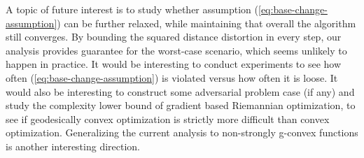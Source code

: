 A topic of future interest is to study whether assumption (\ref{eq:base-change-assumption}) can be further relaxed, while maintaining that overall the algorithm still converges. By bounding the squared distance distortion in every step, our analysis provides guarantee for the worst-case scenario, which seems unlikely to happen in practice. It would be interesting to conduct experiments to see how often (\ref{eq:base-change-assumption}) is violated versus how often it is loose. It would also be interesting to construct some adversarial problem case (if any) and study the complexity lower bound of gradient based Riemannian optimization, to see if geodesically convex optimization is strictly more difficult than convex optimization. Generalizing the current analysis to non-strongly g-convex functions is another interesting direction.
